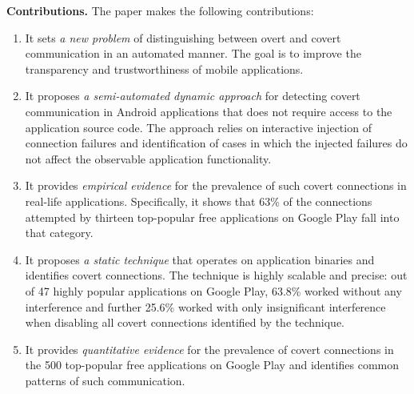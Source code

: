 
\noindent 
{\bf Contributions.}
The paper makes the following contributions:

\vspace{-0.05in}
\begin{enumerate}[leftmargin=0.5cm]\setlength{\itemsep}{-0.01in}

\item It sets \emph{a new problem} of distinguishing between overt and covert communication in an automated manner. 
The goal is to improve the
transparency and trustworthiness of mobile applications.


\item It proposes \emph{a semi-automated dynamic approach} for detecting covert communication in Android applications that does not require access to the application source code. 
The approach relies on interactive injection of connection failures
and identification of cases in which the injected failures do not
affect the observable application functionality.

\item It provides \emph{empirical evidence} for the prevalence of such covert connections in real-life applications. Specifically, it shows that 63\% of the connections attempted by thirteen top-popular free applications on Google Play fall into that category.    

\item It proposes \emph{a static technique} that operates on
application binaries and identifies covert connections. 
The
technique is highly scalable and precise: out of 47 highly popular
applications on Google Play, 63.8\% worked without any interference
and further 25.6\% worked with only insignificant interference when
disabling all covert connections identified by the technique.


\item It provides \emph{quantitative evidence} for the prevalence of covert connections in the 500 top-popular free applications on Google Play and identifies common patterns of such communication. 


\end{enumerate}


